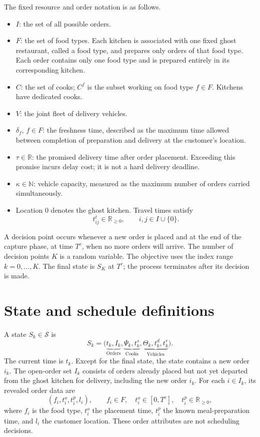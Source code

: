 \documentclass{article}
\begin{document}
The fixed resource and order notation is as follows.
\begin{itemize}
\item \(I\): the set of all possible orders.
\item \(F\): the set of food types. Each kitchen is associated with one fixed ghost restaurant, called a food type, and prepares only orders of that food type. Each order contains only one food type and is prepared entirely in its corresponding kitchen.
\item \(C\): the set of cooks; \(C^f\) is the subset working on food type \(f\in F\). Kitchens have dedicated cooks.
\item \(V\): the joint fleet of delivery vehicles.
\item \(\delta_f\), \(f\in F\): the freshness time, described as the maximum time allowed between completion of preparation and delivery at the customer's location.
\item \(\tau\in\mathbb{R}\): the promised delivery time after order placement. Exceeding this promise incurs delay cost; it is not a hard delivery deadline.
\item \(\kappa\in\mathbb{N}\): vehicle capacity, measured as the maximum number of orders carried simultaneously.
\item Location \(0\) denotes the ghost kitchen. Travel times satisfy
\[
t^t_{ij}\in\mathbb{R}_{\geq 0},\qquad i,j\in I\cup\{0\}.
\]
\end{itemize}

A decision point occurs whenever a new order is placed and at the end of the capture phase, at time \(T^c\), when no more orders will arrive. The number of decision points \(K\) is a random variable. The objective uses the index range \(k=0,\ldots,K\). The final state is \(S_K\) at \(T^c\); the process terminates after its decision is made.

\section*{State and schedule definitions}

A state \(S_k\in\mathcal{S}\) is
\begin{equation}
S_k=\bigl(\underbrace{t_k,I_k}_{\text{Orders}},
\underbrace{\Psi_k,t^s_k}_{\text{Cooks}},
\underbrace{\Theta_k,t^d_k,t^r_k}_{\text{Vehicles}}\bigr).
\tag{1}
\end{equation}
The current time is \(t_k\). Except for the final state, the state contains a new order \(i_k\). The open-order set \(I_k\) consists of orders already placed but not yet departed from the ghost kitchen for delivery, including the new order \(i_k\). For each \(i\in I_k\), its revealed order data are
\[
(f_i,t^o_i,t^p_i,l_i),\qquad
f_i\in F,\quad t^o_i\in[0,T^c],\quad t^p_i\in\mathbb{R}_{\geq0},
\]
where \(f_i\) is the food type, \(t^o_i\) the placement time, \(t^p_i\) the known meal-preparation time, and \(l_i\) the customer location. These order attributes are not scheduling decisions.
\end{document}
